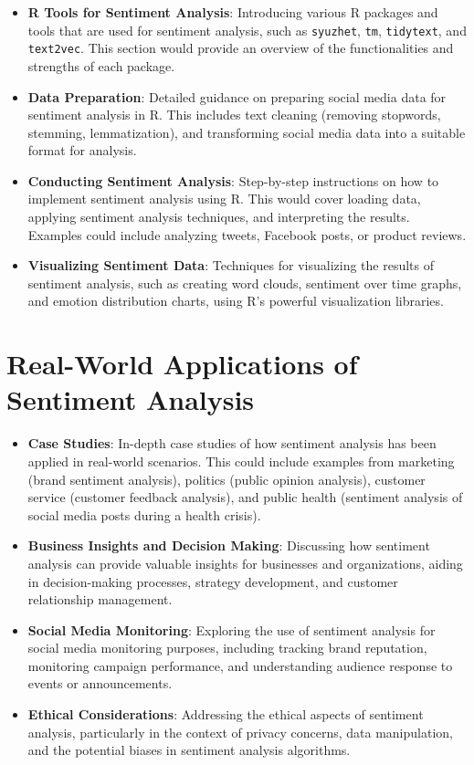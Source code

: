 \documentclass[
]{book}
\providecommand{\tightlist}{%
  \setlength{\itemsep}{0pt}\setlength{\parskip}{0pt}}
\begin{document}
\begin{itemize}
\tightlist
\item
  \textbf{R Tools for Sentiment Analysis}: Introducing various R packages and tools that are used for sentiment analysis, such as \texttt{syuzhet}, \texttt{tm}, \texttt{tidytext}, and \texttt{text2vec}. This section would provide an overview of the functionalities and strengths of each package.
\item
  \textbf{Data Preparation}: Detailed guidance on preparing social media data for sentiment analysis in R. This includes text cleaning (removing stopwords, stemming, lemmatization), and transforming social media data into a suitable format for analysis.
\item
  \textbf{Conducting Sentiment Analysis}: Step-by-step instructions on how to implement sentiment analysis using R. This would cover loading data, applying sentiment analysis techniques, and interpreting the results. Examples could include analyzing tweets, Facebook posts, or product reviews.
\item
  \textbf{Visualizing Sentiment Data}: Techniques for visualizing the results of sentiment analysis, such as creating word clouds, sentiment over time graphs, and emotion distribution charts, using R's powerful visualization libraries.
\end{itemize}

\hypertarget{real-world-applications-of-sentiment-analysis}{%
\section*{Real-World Applications of Sentiment Analysis}\label{real-world-applications-of-sentiment-analysis}}

\begin{itemize}
\tightlist
\item
  \textbf{Case Studies}: In-depth case studies of how sentiment analysis has been applied in real-world scenarios. This could include examples from marketing (brand sentiment analysis), politics (public opinion analysis), customer service (customer feedback analysis), and public health (sentiment analysis of social media posts during a health crisis).
\item
  \textbf{Business Insights and Decision Making}: Discussing how sentiment analysis can provide valuable insights for businesses and organizations, aiding in decision-making processes, strategy development, and customer relationship management.
\item
  \textbf{Social Media Monitoring}: Exploring the use of sentiment analysis for social media monitoring purposes, including tracking brand reputation, monitoring campaign performance, and understanding audience response to events or announcements.
\item
  \textbf{Ethical Considerations}: Addressing the ethical aspects of sentiment analysis, particularly in the context of privacy concerns, data manipulation, and the potential biases in sentiment analysis algorithms.
\end{itemize}
\end{document}
